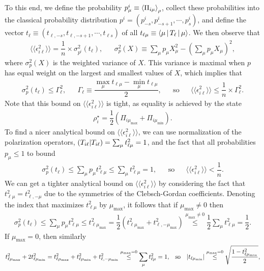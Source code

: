 \documentclass[notitlepage,twocolumn]{revtex4-2}
\renewcommand{\t}{\text} %
\newcommand{\f}[2]{\dfrac{#1}{#2}} %
\newcommand{\p}[1]{\left(#1\right)} %
\newcommand{\bk}{\Braket} %
\newcommand{\bbk}[1]{\langle\!\langle #1 \rangle\!\rangle}
\def\obk#1{\mathinner{({#1})}}
\begin{document}
To this end, we define the probability $p^i_\mu\equiv\bk{\Pi_{i\mu}}_\rho$, collect these probabilities into the classical probability distribution $p^i = \p{p^i_{-s}, p^i_{-s+1}, \cdots, p^i_s}$, and define the vector $t_\ell \equiv \p{t_{\ell,-s},t_{\ell,-s+1},\cdots,t_{\ell s}}$ of all $t_{\ell\mu}\equiv\bk{\mu|T_\ell|\mu}$.
We then observe that
\begin{align}
  \bbk{\epsilon_{i\ell}^2} = \f1n \times \sigma_{p^i}^2\p{t_\ell},
  &&
  \sigma_p^2\p{X}
  \equiv \sum_\mu p_\mu X_\mu^2 - \p{\sum_\mu p_\mu X_\mu}^2,
\end{align}
where $\sigma_p^2\p{X}$ is the weighted variance of $X$.
This variance is maximal when $p$ has equal weight on the largest and smallest values of $X$, which implies that
\begin{align}
  \sigma_p^2\p{t_\ell} \le \Gamma_\ell^2,
  &&
  \Gamma_\ell \equiv \f{\max_\mu t_{\ell\mu} - \min_\mu t_{\ell\mu}}{2},
  &&
  \t{so}
  &&
  \bbk{\epsilon_{i\ell}^2} \le \f1n \times \Gamma_\ell^2.
\end{align}
Note that this bound on $\bbk{\epsilon_{i\ell}^2}$ is tight, as equality is achieved by the state
\begin{align}
  \rho_i^\star = \f12\p{\Pi_{i\mu_{\t{max}}} + \Pi_{i\mu_{\t{min}}}}.
\end{align}
To find a nicer analytical bound on $\bbk{\epsilon_{i\ell}^2}$, we can use normalization of the polarization operators, $\obk{T_{i\ell}|T_{i\ell}}=\sum_\mu t_{\ell\mu}^2 = 1$, and the fact that all probabilities $p_\mu\le1$ to bound
\begin{align}
  \sigma_p^2\p{t_\ell} \le \sum_\mu p_\mu t_{\ell\mu}^2
  \le \sum_\mu t_{\ell\mu}^2 = 1,
  &&
  \t{so}
  &&
  \bbk{\epsilon_{i\ell}^2} < \f1n.
\end{align}
We can get a tighter analytical bound on $\bbk{\epsilon_{i\ell}^2}$ by considering the fact that $t_{\ell\mu}^2 = t_{\ell,-\mu}^2$ due to the symmetries of the Clebsch-Gordan coefficients.
Denoting the index that maximizes $t_{\ell\mu}^2$ by $\mu_{\t{max}}$, it follows that if $\mu_{\t{max}}\ne0$ then
\begin{align}
  \sigma_p^2\p{t_\ell} \le \sum_\mu p_\mu t_{\ell\mu}^2
  \le t_{\ell\mu_{\t{max}}}^2
  = \f12 \p{t_{\ell\mu_{\t{max}}}^2 + t_{\ell,-\mu_{\t{max}}}^2}
  \stackrel{\mu_{\t{max}}\ne0}{\le} \f12 \sum_\mu t_{\ell\mu}^2
  = \f12.
\end{align}
If $\mu_{\t{max}}=0$, then similarly
\begin{align}
  t_{\ell\mu_{\t{max}}}^2 + 2 t_{\ell\mu_{\t{min}}}^2
  = t_{\ell\mu_{\t{max}}}^2 + t_{\ell\mu_{\t{min}}}^2
  + t_{\ell,-\mu_{\t{min}}}^2
  \stackrel{\mu_{\t{max}}=0}{\le}
  \sum_\mu t_{\ell\mu}^2 = 1,
  &&
  \t{so}
  &&
  \abs{t_{\ell\mu_{\t{min}}}}
  \stackrel{\mu_{\t{max}}=0}{\le}
  \sqrt{\f{1 - t_{\ell\mu_{\t{max}}}^2}{2}},
\end{align}
\end{document}
